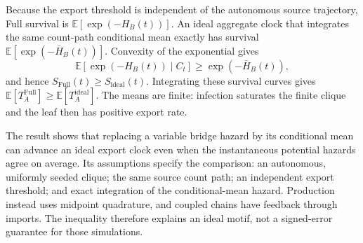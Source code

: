 \documentclass[10pt]{article}
\begin{document}
{Because the export threshold is independent of the autonomous source trajectory, Full survival is $\mathbb{E}[\exp(-H_B(t))]$. An ideal aggregate clock that integrates the same count-path conditional mean exactly has survival $\mathbb{E}[\exp(-\bar H_B(t))]$. Convexity of the exponential gives
\begin{equation*}
\mathbb{E}[\exp(-H_B(t))\mid C_t]\geq \exp(-\bar H_B(t)),
\end{equation*}
and hence $S_{\mathrm{Full}}(t)\geq S_{\mathrm{ideal}}(t)$. Integrating these survival curves gives $\mathbb{E}[T_A^{\mathrm{Full}}]\geq\mathbb{E}[T_A^{\mathrm{ideal}}]$. The means are finite: infection saturates the finite clique and the leaf then has positive export rate.

The result shows that replacing a variable bridge hazard by its conditional mean can advance an ideal export clock even when the instantaneous potential hazards agree on average. Its assumptions specify the comparison: an autonomous, uniformly seeded clique; the same source count path; an independent export threshold; and exact integration of the conditional-mean hazard. Production instead uses midpoint quadrature, and coupled chains have feedback through imports. The inequality therefore explains an ideal motif, not a signed-error guarantee for those simulations.
}
\end{document}
